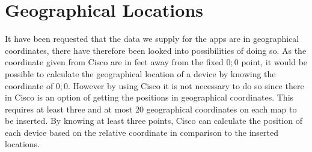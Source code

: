 \section{Geographical Locations} \label{sec:geo_coordinates}
It have been requested that the data we supply for the apps are in geographical coordinates, there have therefore been looked into possibilities of doing so.
As the coordinate given from Cisco are in feet away from the fixed ${0;0}$ point, it would be possible to calculate the geographical location of a device by knowing the coordinate of ${0;0}$. 
However by using Cisco it is not necessary to do so since there in Cisco is an option of getting the positions in geographical coordinates. This requires at least three and at most 20 geographical coordinates on each map to be inserted. By knowing at least three points, Cisco can calculate the position of each device based on the relative coordinate in comparison to the inserted locations\cite{geo_cisco}.



